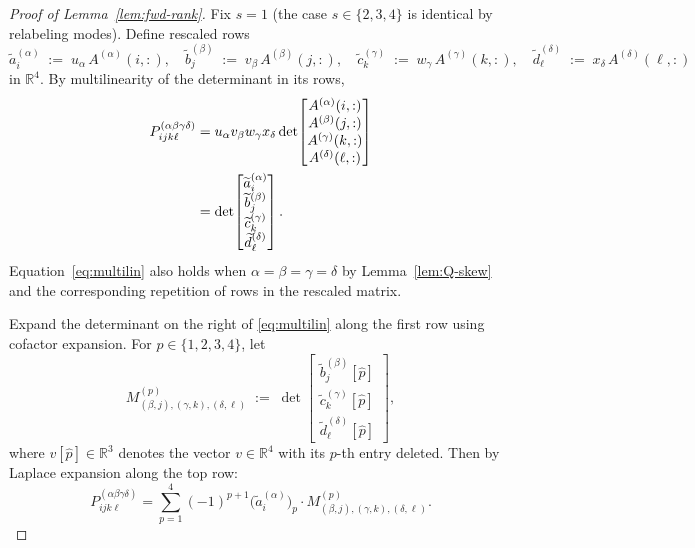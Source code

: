 \documentclass[12pt]{article}
\theoremstyle{definition}
\begin{document}
\begin{proof}[Proof of Lemma~\ref{lem:fwd-rank}]
Fix $s=1$ (the case $s\in\{2,3,4\}$ is identical by relabeling modes). Define rescaled rows
\begin{equation}\label{eq:rescaled-rows}
\widetilde{a}^{(\alpha)}_i\;:=\;u_\alpha\, A^{(\alpha)}(i,:),\quad
\widetilde{b}^{(\beta)}_j\;:=\;v_\beta\, A^{(\beta)}(j,:),\quad
\widetilde{c}^{(\gamma)}_k\;:=\;w_\gamma\, A^{(\gamma)}(k,:),\quad
\widetilde{d}^{(\delta)}_\ell\;:=\;x_\delta\, A^{(\delta)}(\ell,:)
\end{equation}
in $\mathbb{R}^4$. By multilinearity of the determinant in its rows,
\begin{align}
P^{(\alpha\beta\gamma\delta)}_{ijk\ell}
&=u_\alpha v_\beta w_\gamma x_\delta\det\!\begin{bmatrix}A^{(\alpha)}(i,:)\\A^{(\beta)}(j,:)\\A^{(\gamma)}(k,:)\\A^{(\delta)}(\ell,:)\end{bmatrix}\notag\\
&=\det\!\begin{bmatrix}\widetilde{a}^{(\alpha)}_i\\ \widetilde{b}^{(\beta)}_j\\ \widetilde{c}^{(\gamma)}_k\\ \widetilde{d}^{(\delta)}_\ell\end{bmatrix}.\label{eq:multilin}
\end{align}
Equation~\eqref{eq:multilin} also holds when $\alpha=\beta=\gamma=\delta$ by
Lemma~\ref{lem:Q-skew} and the corresponding repetition of rows in the rescaled matrix.

Expand the determinant on the right of \eqref{eq:multilin} along the first row using cofactor
expansion. For $p\in\{1,2,3,4\}$, let
\begin{equation}\label{eq:Mp}
M^{(p)}_{(\beta,j),(\gamma,k),(\delta,\ell)}
\;:=\;\det\!\begin{bmatrix}
\widetilde{b}^{(\beta)}_j[\widehat{p}]\\
\widetilde{c}^{(\gamma)}_k[\widehat{p}]\\
\widetilde{d}^{(\delta)}_\ell[\widehat{p}]
\end{bmatrix},
\end{equation}
where $v[\widehat{p}]\in\mathbb{R}^3$ denotes the vector $v\in\mathbb{R}^4$ with its $p$-th
entry deleted. Then by Laplace expansion along the top row:
\begin{equation}\label{eq:Laplace}
P^{(\alpha\beta\gamma\delta)}_{ijk\ell}
=\sum_{p=1}^{4}(-1)^{p+1}\bigl(\widetilde{a}^{(\alpha)}_i\bigr)_p\cdot
M^{(p)}_{(\beta,j),(\gamma,k),(\delta,\ell)}.
\end{equation}


\end{proof}
\end{document}
